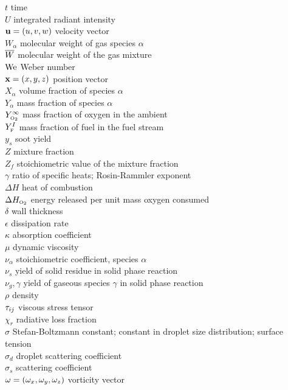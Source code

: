 \begin{tabbing}
$t$                       \> time           \\
$U$                       \> integrated radiant intensity \\
${\bf u}=(u,v,w)$             \> velocity vector  \\
$W_\alpha$                \> molecular weight of gas species $\alpha$ \\
$\overline{W}$                     \> molecular weight of the gas mixture \\
$\hbox{We}$                     \> Weber number \\
${\bf x}=(x,y,z)$             \> position vector  \\
$X_\alpha$                \> volume fraction of species $\alpha$   \\
$Y_\alpha$                \> mass fraction of species $\alpha$   \\
$Y_{\tiny \hbox{O}_2}^\infty$          \> mass fraction of oxygen in the ambient   \\
$Y_{\tiny \hbox{F}}^I$                  \> mass fraction of fuel in the fuel stream   \\
$y_s$                     \> soot yield \\
$Z$                       \> mixture fraction   \\
$Z_f$                     \> stoichiometric value of the mixture fraction   \\
$\gamma$                  \> ratio of specific heats; Rosin-Rammler exponent \\
$\Delta H$                \> heat of combustion \\
$\Delta H_{\tiny \hbox{O}_2}$          \> energy released per unit mass oxygen consumed \\
$\delta$                  \> wall thickness \\
$\epsilon$                \> dissipation rate \\
$\kappa$                  \> absorption coefficient \\
$\mu$                     \> dynamic viscosity \\
$\nu_\alpha$              \> stoichiometric coefficient, species $\alpha$ \\
$\nu_s$           \> yield of solid residue in solid phase reaction \\
$\nu_g,\gamma$    \> yield of gaseous species $\gamma$ in solid phase reaction \\
$\rho$                    \> density \\
${\bf \tau}_{ij}$              \> viscous stress tensor \\
$\chi_r$                  \> radiative loss fraction \\
$\sigma$                  \> Stefan-Boltzmann constant; constant in droplet size distribution; surface tension \\
$\sigma_d$                \> droplet scattering coefficient \\
$\sigma_s$                \> scattering coefficient \\
${\bf \omega}=(\omega_x,\omega_y,\omega_z)$    \> vorticity vector \\
\end{tabbing}





